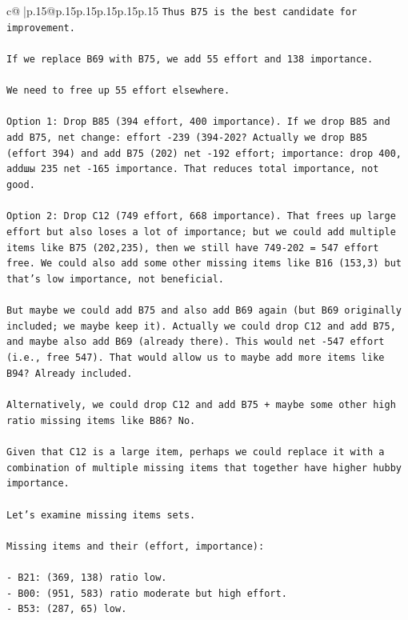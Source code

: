 \documentclass{article}
\begin{document}
{\begin{supertabular}{c@{$\;$}|p{.15\linewidth}@{}p{.15\linewidth}p{.15\linewidth}p{.15\linewidth}p{.15\linewidth}p{.15\linewidth}}
{{{\texttt{Thus B75 is the best candidate for improvement.} \\
\\ 
\texttt{If we replace B69 with B75, we add 55 effort and 138 importance.} \\
\\ 
\texttt{We need to free up 55 effort elsewhere.} \\
\\ 
\texttt{Option 1: Drop B85 (394 effort, 400 importance). If we drop B85 and add B75, net change: effort {-}239 (394{-}202? Actually we drop B85 (effort 394) and add B75 (202) net {-}192 effort; importance: drop 400, addшы 235 net {-}165 importance. That reduces total importance, not good.} \\
\\ 
\texttt{Option 2: Drop C12 (749 effort, 668 importance). That frees up large effort but also loses a lot of importance; but we could add multiple items like B75 (202,235), then we still have 749{-}202 = 547 effort free. We could also add some other missing items like B16 (153,3) but that's low importance, not beneficial.} \\
\\ 
\texttt{But maybe we could add B75 and also add B69 again (but B69 originally included; we maybe keep it). Actually we could drop C12 and add B75, and maybe also add B69 (already there). This would net {-}547 effort (i.e., free 547). That would allow us to maybe add more items like B94? Already included.} \\
\\ 
\texttt{Alternatively, we could drop C12 and add B75 + maybe some other high ratio missing items like B86? No.} \\
\\ 
\texttt{Given that C12 is a large item, perhaps we could replace it with a combination of multiple missing items that together have higher hubby importance.} \\
\\ 
\texttt{Let's examine missing items sets.} \\
\\ 
\texttt{Missing items and their (effort, importance):} \\
\\ 
\texttt{{-} B21: (369, 138) ratio low.} \\
\texttt{{-} B00: (951, 583) ratio moderate but high effort.} \\
\texttt{{-} B53: (287, 65) low.} \\
}}}
\end{supertabular}}
\end{document}

